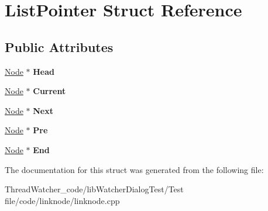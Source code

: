 \hypertarget{struct_list_pointer}{\section{List\+Pointer Struct Reference}
\label{struct_list_pointer}
}
\subsection*{Public Attributes}
\begin{DoxyCompactItemize}
\item 
\hypertarget{struct_list_pointer_af2dddd50fb039be8d6c4d421fc80685d}{\hyperlink{struct_node}{Node} $\ast$ {\bfseries Head}}\label{struct_list_pointer_af2dddd50fb039be8d6c4d421fc80685d}

\item 
\hypertarget{struct_list_pointer_adfd7eb06f2bddf924ae1dd1583616a08}{\hyperlink{struct_node}{Node} $\ast$ {\bfseries Current}}\label{struct_list_pointer_adfd7eb06f2bddf924ae1dd1583616a08}

\item 
\hypertarget{struct_list_pointer_aca137bc11622e0b17c68e5e717b6e993}{\hyperlink{struct_node}{Node} $\ast$ {\bfseries Next}}\label{struct_list_pointer_aca137bc11622e0b17c68e5e717b6e993}

\item 
\hypertarget{struct_list_pointer_a03c9a4210852365dec99d2a328944f3e}{\hyperlink{struct_node}{Node} $\ast$ {\bfseries Pre}}\label{struct_list_pointer_a03c9a4210852365dec99d2a328944f3e}

\item 
\hypertarget{struct_list_pointer_af61cac0287921f7f8616bbd60edb99d0}{\hyperlink{struct_node}{Node} $\ast$ {\bfseries End}}\label{struct_list_pointer_af61cac0287921f7f8616bbd60edb99d0}

\end{DoxyCompactItemize}


The documentation for this struct was generated from the following file\+:\begin{DoxyCompactItemize}
\item 
Thread\+Watcher\+\_\+code/lib\+Watcher\+Dialog\+Test/\+Test file/code/linknode/linknode.\+cpp\end{DoxyCompactItemize}
